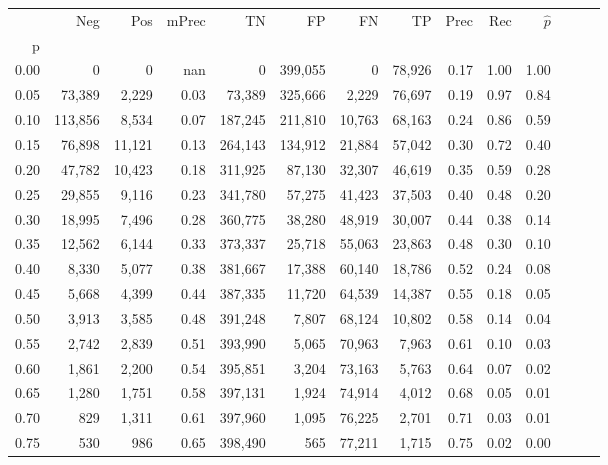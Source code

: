 \begin{tabular}{rrrrrrrrrrrrrr}
\toprule
{} &      Neg &     Pos & mPrec &       TN &       FP &      FN &      TP &  Prec &   Rec & $\hat{p}$ \\
p    &          &         &       &          &          &         &         &       &       &           \\
\midrule
0.00 &        0 &       0 &   nan &        0 &  399,055 &       0 &  78,926 &  0.17 &  1.00 &      1.00 \\
0.05 &   73,389 &   2,229 &  0.03 &   73,389 &  325,666 &   2,229 &  76,697 &  0.19 &  0.97 &      0.84 \\
0.10 &  113,856 &   8,534 &  0.07 &  187,245 &  211,810 &  10,763 &  68,163 &  0.24 &  0.86 &      0.59 \\
0.15 &   76,898 &  11,121 &  0.13 &  264,143 &  134,912 &  21,884 &  57,042 &  0.30 &  0.72 &      0.40 \\
0.20 &   47,782 &  10,423 &  0.18 &  311,925 &   87,130 &  32,307 &  46,619 &  0.35 &  0.59 &      0.28 \\
0.25 &   29,855 &   9,116 &  0.23 &  341,780 &   57,275 &  41,423 &  37,503 &  0.40 &  0.48 &      0.20 \\
0.30 &   18,995 &   7,496 &  0.28 &  360,775 &   38,280 &  48,919 &  30,007 &  0.44 &  0.38 &      0.14 \\
0.35 &   12,562 &   6,144 &  0.33 &  373,337 &   25,718 &  55,063 &  23,863 &  0.48 &  0.30 &      0.10 \\
0.40 &    8,330 &   5,077 &  0.38 &  381,667 &   17,388 &  60,140 &  18,786 &  0.52 &  0.24 &      0.08 \\
0.45 &    5,668 &   4,399 &  0.44 &  387,335 &   11,720 &  64,539 &  14,387 &  0.55 &  0.18 &      0.05 \\
0.50 &    3,913 &   3,585 &  0.48 &  391,248 &    7,807 &  68,124 &  10,802 &  0.58 &  0.14 &      0.04 \\
0.55 &    2,742 &   2,839 &  0.51 &  393,990 &    5,065 &  70,963 &   7,963 &  0.61 &  0.10 &      0.03 \\
0.60 &    1,861 &   2,200 &  0.54 &  395,851 &    3,204 &  73,163 &   5,763 &  0.64 &  0.07 &      0.02 \\
0.65 &    1,280 &   1,751 &  0.58 &  397,131 &    1,924 &  74,914 &   4,012 &  0.68 &  0.05 &      0.01 \\
0.70 &      829 &   1,311 &  0.61 &  397,960 &    1,095 &  76,225 &   2,701 &  0.71 &  0.03 &      0.01 \\
0.75 &      530 &     986 &  0.65 &  398,490 &      565 &  77,211 &   1,715 &  0.75 &  0.02 &      0.00 \\

\end{tabular}
